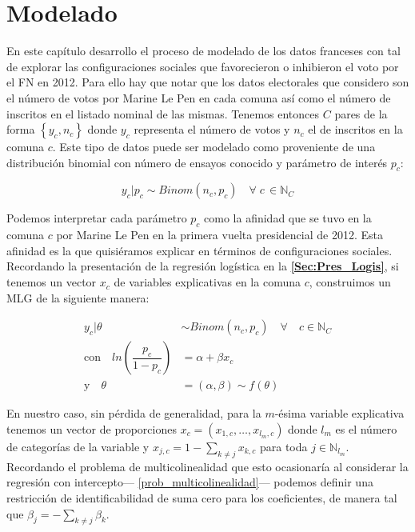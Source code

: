 \chapter{Modelado}

En este capítulo desarrollo el proceso de modelado de los datos franceses con tal de explorar las configuraciones sociales que favorecieron o inhibieron el voto por el FN en 2012. Para ello hay que notar que los datos electorales que considero son el número de votos por Marine Le Pen en cada comuna así como el número de inscritos en el listado nominal de las mismas. Tenemos entonces $C$ pares de la forma $\left\lbrace y_c, n_c \right\rbrace$ donde $y_c$ representa el número de votos y $n_c$ el de inscritos en la comuna $c$. Este tipo de datos puede ser modelado como proveniente de una distribución binomial con número de ensayos conocido y parámetro de interés $p_c$: 

\begin{equation*}
y_c|p_c \sim Binom(n_c, p_c) \quad \forall \; c \, \in \mathbb{N}_C
\end{equation*} 

Podemos interpretar cada parámetro $p_c$ como la afinidad que se tuvo en la comuna $c$ por Marine Le Pen en la primera vuelta presidencial de 2012. Esta afinidad es la que quisiéramos explicar en términos de configuraciones sociales.\\

Recordando la presentación de la regresión logística en la \textbf{\autoref{Sec:Pres_Logis}}, si tenemos un vector $x_c$ de variables explicativas en la comuna $c$, construimos un MLG de la siguiente manera: 

\begin{align*}
y_c|\theta & \sim Binom(n_c,p_c) \quad \forall \quad c \in \mathbb{N}_C \\
\text{con} \quad ln\left(\dfrac{p_c}{1-p_c}\right) &= \alpha + \beta x_c \nonumber \\
\text{y} \quad \theta &= (\alpha,\beta) \sim f(\theta)
\end{align*}

En nuestro caso, sin pérdida de generalidad, para la $m$-ésima variable explicativa tenemos un vector de proporciones $x_c=(x_{1,c},\dots,x_{l_m,c})$ donde $l_m$ es el número de categorías de la variable y $x_{j,c}=1 - \sum_{k\neq j} x_{k,c}$ para toda $j \in \mathbb{N}_{l_m}$. Recordando el problema de multicolinealidad que esto ocasionaría al considerar la regresión con intercepto--- \autoref{prob_multicolinealidad}--- podemos definir una restricción de identificabilidad de suma cero para los coeficientes, de manera tal que $\beta_j=-\sum\limits_{k\neq j}\beta_k$.\\


